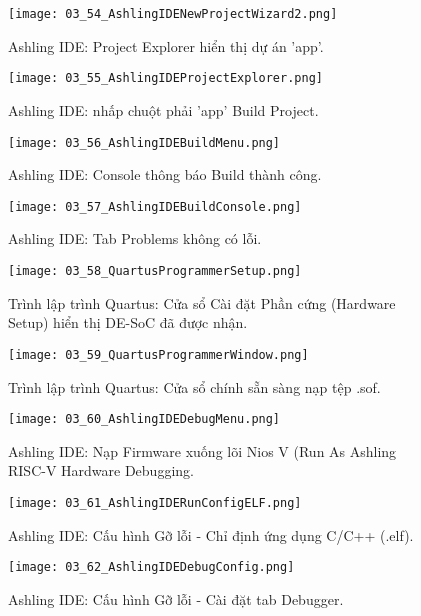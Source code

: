\begin{figure}[htbp] \centering \texttt{[image: 03\_54\_AshlingIDENewProjectWizard2.png]} \caption{Ashling IDE: Project Explorer hiển thị dự án 'app'.} \label{fig:03_54} \end{figure}
\begin{figure}[htbp] \centering \texttt{[image: 03\_55\_AshlingIDEProjectExplorer.png]} \caption{Ashling IDE: nhấp chuột phải 'app' \longrightarrow Build Project.} \label{fig:03_55} \end{figure}
\begin{figure}[htbp] \centering \texttt{[image: 03\_56\_AshlingIDEBuildMenu.png]} \caption{Ashling IDE: Console thông báo Build thành công.} \label{fig:03_56} \end{figure}
\begin{figure}[htbp] \centering \texttt{[image: 03\_57\_AshlingIDEBuildConsole.png]} \caption{Ashling IDE: Tab Problems không có lỗi.} \label{fig:03_57} \end{figure}
\begin{figure}[htbp] \centering \texttt{[image: 03\_58\_QuartusProgrammerSetup.png]} \caption{Trình lập trình Quartus: Cửa sổ Cài đặt Phần cứng (Hardware Setup) hiển thị DE-SoC đã được nhận.} \label{fig:03_58} \end{figure}
\begin{figure}[htbp] \centering \texttt{[image: 03\_59\_QuartusProgrammerWindow.png]} \caption{Trình lập trình Quartus: Cửa sổ chính sẵn sàng nạp tệp .sof.} \label{fig:03_59} \end{figure}
\begin{figure}[htbp] \centering \texttt{[image: 03\_60\_AshlingIDEDebugMenu.png]} \caption{Ashling IDE: Nạp Firmware xuống lõi Nios V (Run As \longrightarrow Ashling RISC-V Hardware Debugging.} \label{fig:03_60} \end{figure}
\begin{figure}[htbp] \centering \texttt{[image: 03\_61\_AshlingIDERunConfigELF.png]} \caption{Ashling IDE: Cấu hình Gỡ lỗi - Chỉ định ứng dụng C/C++ (.elf).} \label{fig:03_61} \end{figure}
\begin{figure}[htbp] \centering \texttt{[image: 03\_62\_AshlingIDEDebugConfig.png]} \caption{Ashling IDE: Cấu hình Gỡ lỗi - Cài đặt tab Debugger.} \label{fig:03_62} \end{figure}
